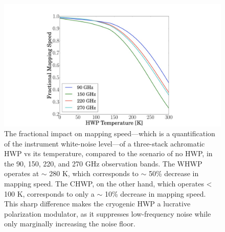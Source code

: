 \begin{figure}[ht!]
    \centering
    \includegraphics[width=0.98\linewidth]{CHWPDesign/Figures/chwp_mapping_speed.jpg}
    \caption[The impact of a cryogenic half-wave plate on instrument mapping speed]{The fractional impact on mapping speed---which is a quantification of the instrument white-noise level---of a three-stack achromatic HWP vs its temperature, compared to the scenario of no HWP, in the 90, 150, 220, and 270 GHz observation bands. The WHWP operates at $\sim$ 280 K, which corresponds to $\sim$ 50\% decrease in mapping speed. The CHWP, on the other hand, which operates < 100 K, corresponds to only a $\sim$ 10\% decrease in mapping speed. This sharp difference makes the cryogenic HWP a lucrative polarization modulator, as it suppresses low-frequency noise while only marginally increasing the noise floor.}
    \label{fig:chwp_mapping_speed}
\end{figure}

